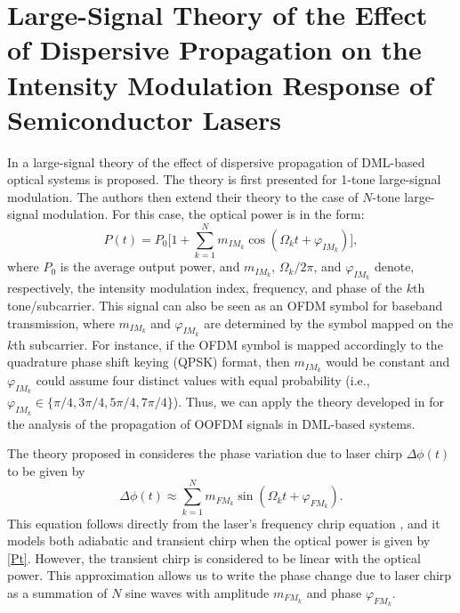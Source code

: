 \documentclass[journal]{IEEEtran}
\begin{document}
\section{Large-Signal Theory of the Effect of Dispersive Propagation on the Intensity Modulation Response of Semiconductor Lasers} \label{sec:theory}
In \cite{eva} a large-signal theory of the effect of dispersive propagation of DML-based optical systems is proposed. The theory is first presented for 1-tone large-signal modulation. The authors then extend their theory to the case of $N$-tone large-signal modulation. For this case, the optical power is in the form:
\begin{equation} \label{Pt}
P(t) = P_0\Bigg[1 + \sum_{k=1}^N m_{IM_k}\cos(\Omega_k t + \varphi_{IM_k})\Bigg],
\end{equation}
where $P_0$ is the average output power, and $m_{IM_k}$, $\Omega_k/2\pi$, and $\varphi_{IM_k}$ denote, respectively, the intensity modulation index, frequency, and phase of the $k$th tone/subcarrier. This signal can also be seen as an OFDM symbol for baseband transmission, where $m_{IM_k}$ and $\varphi_{IM_k}$ are determined by the symbol mapped on the $k$th subcarrier. For instance, if the OFDM symbol is mapped accordingly to the quadrature phase shift keying (QPSK) format, then $m_{IM_k}$ would be constant and $\varphi_{IM_k}$ could assume four distinct values with equal probability (i.e., $\varphi_{IM_k} \in \{\pi/4, 3\pi/4, 5\pi/4, 7\pi/4\}$). Thus, we can apply the theory developed in \cite{eva} for the analysis of the propagation of OOFDM signals in DML-based systems. 

The theory proposed in \cite{eva} consideres the phase variation due to laser chirp $\Delta\phi(t)$ to be given by
\begin{equation} \label{Dphi}
\Delta\phi(t) \approx \sum_{k =1}^N m_{FM_k}\sin(\Omega_kt + \varphi_{FM_k}).
\end{equation}
This equation follows directly from the laser's frequency chrip equation \cite{corvini}, and it models both adiabatic and transient chirp when the optical power is given by \eqref{Pt}. However, the transient chirp is considered to be linear with the optical power. This approximation allows us to write the phase change due to laser chirp as a summation of $N$ sine waves with amplitude $m_{FM_k}$ and phase $\varphi_{FM_k}$.
\end{document}
